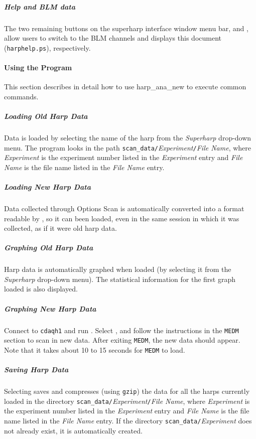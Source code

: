 {	\subparagraph{Help and BLM data}

The two remaining buttons on the superharp interface window menu bar,  and
, allow users to switch to the BLM channels and displays this document ({\tt harphelp.ps}),
respectively.

\paragraph{Using the Program}\label{program}

This section describes in detail how to use harp\_ana\_new to execute common commands.

	\subparagraph{Loading Old Harp Data}

Data is loaded by selecting the name of the harp from the {\it Superharp} drop-down menu.  The program
looks in the path {\tt scan\_data/}{\it Experiment}{\tt /}{\it File Name}, where {\it Experiment} is
the experiment number listed in the {\it Experiment} entry and {\it File Name} is the file name listed
in the {\it File Name} entry.

	\subparagraph{Loading New Harp Data}

Data collected through Options Scan is automatically converted into a format readable by
{}, so it can been loaded, even in the same session in which it was collected,
as if it were old harp data.

	\subparagraph{Graphing Old Harp Data}

Harp data is automatically graphed when loaded (by selecting it from the {\it Superharp} drop-down menu).
The statistical information for the first graph loaded is also displayed.

	\subparagraph{Graphing New Harp Data}

Connect to {\tt cdaqh1} and run .  Select , and follow the
instructions in the {\tt MEDM} section to scan in new data.  After exiting {\tt MEDM}, the new data should
appear. Note that it takes about 10 to 15 seconds for {\tt MEDM} to load.

	\subparagraph{Saving Harp Data}

Selecting  saves and compresses (using {\tt gzip}) the data for all the harps
currently loaded in the directory {\tt scan\_data/}{\it Experiment}{\tt /}{\it File Name}, where
{\it Experiment} is the experiment number listed in the {\it Experiment} entry and {\it File Name}
is the file name listed in the {\it File Name} entry.  If the directory {\tt scan\_data/}{\it Experiment}
does not already exist, it is automatically created.

}
